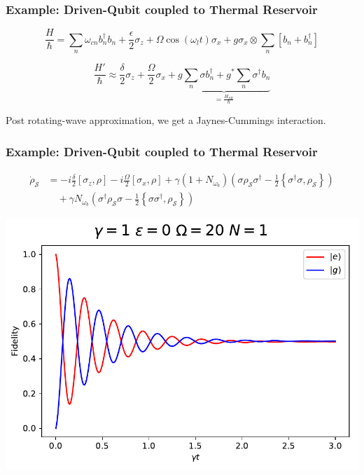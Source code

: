 \documentclass{beamer}
\begin{document}
\begin{frame}
\frametitle{Example: Driven-Qubit coupled to Thermal Reservoir}

\begin{equation}
\frac{H}{\hbar}  = \sum_n \omega_{cn} b_n^\dagger b_n + \frac{\epsilon}{2} \sigma_z + \Omega \cos( \omega_l t )\sigma_x + g \sigma_{x} \otimes\sum_n \left[ b_n + b_n^\dagger \right] \nonumber 
\end{equation}
\centering
{}


\begin{equation}
\frac{H'}{\hbar}  \approx  \frac{\delta}{2} \sigma_z +\frac{ \Omega}{2} \sigma_x + \boxed{ \underbrace{ g   \sum_n \sigma  b_n^\dagger +g^* \sum_n \sigma^\dagger b_n}_{=  \frac{H_{SR}}{\hbar}  }} \nonumber
\end{equation}

Post rotating-wave approximation, we get a Jaynes-Cummings interaction.

\end{frame}



\begin{frame}
\frametitle{Example: Driven-Qubit coupled to Thermal Reservoir}

\begin{align}\label{Optical Block ME}
\dot{\rho}_{\mathcal{S}} & =  - i \frac{\delta}{2} [ \sigma_z, \rho ] - i \frac{\Omega}{2} [ \sigma_x , \rho ] + \gamma ( 1 + N_{\omega_b} ) \left( \sigma \rho_{\mathcal{S}} \sigma^\dagger - \frac{1}{2} \left\lbrace \sigma^\dagger \sigma , \rho_{\mathcal{S}} \right\rbrace \right)  \nonumber \\
& \quad + \gamma N_{\omega_b} \left( \sigma^\dagger \rho_{\mathcal{S}} \sigma - \frac{1}{2} \left\lbrace \sigma \sigma^\dagger , \rho_{\mathcal{S}} \right\rbrace \right) \nonumber
\end{align}

\includegraphics[scale=.5]{decoherence.pdf}

\end{frame}
\end{document}
